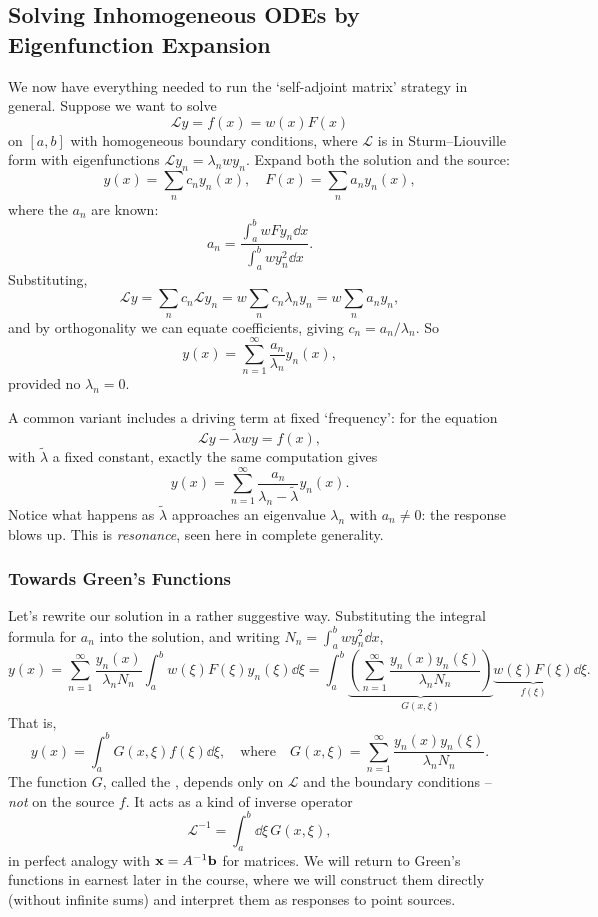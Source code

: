 \documentclass[a4paper]{scrartcl}
\begin{document}
\subsection{Solving Inhomogeneous ODEs by Eigenfunction Expansion}

We now have everything needed to run the `self-adjoint matrix' strategy in general. Suppose we want to solve
$$
\mathcal{L} y = f(x) = w(x) F(x)
$$
on $[a, b]$ with homogeneous boundary conditions, where $\mathcal{L}$ is in Sturm--Liouville form with eigenfunctions $\mathcal{L} y_n = \lambda_n w y_n$. Expand both the solution and the source:
$$
y(x) = \sum_n c_n y_n(x), \quad F(x) = \sum_n a_n y_n(x),
$$
where the $a_n$ are known:
$$
a_n = \frac{\int_a^b w F y_n \dd x}{\int_a^b w y_n^2 \dd x}.
$$
Substituting,
$$
\mathcal{L} y = \sum_n c_n \mathcal{L} y_n = w \sum_n c_n \lambda_n y_n = w \sum_n a_n y_n,
$$
and by orthogonality we can equate coefficients, giving $c_n = a_n / \lambda_n$. So
$$
y(x) = \sum_{n = 1}^{\infty} \frac{a_n}{\lambda_n} y_n(x),
$$
provided no $\lambda_n = 0$.

A common variant includes a driving term at fixed `frequency': for the equation
$$
\mathcal{L}y - \tilde{\lambda} w y = f(x),
$$
with $\tilde{\lambda}$ a fixed constant, exactly the same computation gives
$$
y(x) = \sum_{n = 1}^{\infty} \frac{a_n}{\lambda_n - \tilde{\lambda}} y_n(x).
$$
Notice what happens as $\tilde{\lambda}$ approaches an eigenvalue $\lambda_n$ with $a_n \neq 0$: the response blows up. This is \emph{resonance}, seen here in complete generality.

\subsubsection*{Towards Green's Functions}

Let's rewrite our solution in a rather suggestive way. Substituting the integral formula for $a_n$ into the solution, and writing $N_n = \int_a^b w y_n^2 \dd x$,
$$
y(x) = \sum_{n = 1}^{\infty} \frac{y_n(x)}{\lambda_n N_n} \int_a^b w(\xi) F(\xi) y_n(\xi) \dd \xi
= \int_a^b \underbrace{\left(\sum_{n = 1}^{\infty} \frac{y_n(x) y_n(\xi)}{\lambda_n N_n}\right)}_{G(x, \xi)} \underbrace{w(\xi) F(\xi)}_{f(\xi)} \dd \xi.
$$
That is,
$$
y(x) = \int_a^b G(x, \xi) f(\xi) \dd \xi, \quad \text{where} \quad G(x, \xi) = \sum_{n = 1}^{\infty} \frac{y_n(x) y_n(\xi)}{\lambda_n N_n}.
$$
The function $G$, called the , depends only on $\mathcal{L}$ and the boundary conditions -- \emph{not} on the source $f$. It acts as a kind of inverse operator
$$
\mathcal{L}^{-1} = \int_a^b \dd \xi \, G(x, \xi),
$$
in perfect analogy with $\mathbf{x} = A^{-1} \mathbf{b}$ for matrices. We will return to Green's functions in earnest later in the course, where we will construct them directly (without infinite sums) and interpret them as responses to point sources.
\end{document}
